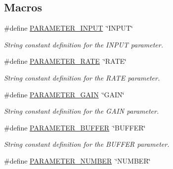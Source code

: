 \subsection*{Macros}
\begin{DoxyCompactItemize}
\item 
\hypertarget{group__command__interpreter_gaf1fc1a31411fef881a2ca2a38d375bda}{\#define \hyperlink{group__command__interpreter_gaf1fc1a31411fef881a2ca2a38d375bda}{P\-A\-R\-A\-M\-E\-T\-E\-R\-\_\-\-I\-N\-P\-U\-T}~\char`\"{}I\-N\-P\-U\-T\char`\"{}}\label{group__command__interpreter_gaf1fc1a31411fef881a2ca2a38d375bda}

\begin{DoxyCompactList}\small\item\em String constant definition for the I\-N\-P\-U\-T parameter. \end{DoxyCompactList}\item 
\hypertarget{group__command__interpreter_ga0edc411fe5766dfbe192e22155fb0020}{\#define \hyperlink{group__command__interpreter_ga0edc411fe5766dfbe192e22155fb0020}{P\-A\-R\-A\-M\-E\-T\-E\-R\-\_\-\-R\-A\-T\-E}~\char`\"{}R\-A\-T\-E\char`\"{}}\label{group__command__interpreter_ga0edc411fe5766dfbe192e22155fb0020}

\begin{DoxyCompactList}\small\item\em String constant definition for the R\-A\-T\-E parameter. \end{DoxyCompactList}\item 
\hypertarget{group__command__interpreter_gaf97c884c75bad1017220b24ccff04016}{\#define \hyperlink{group__command__interpreter_gaf97c884c75bad1017220b24ccff04016}{P\-A\-R\-A\-M\-E\-T\-E\-R\-\_\-\-G\-A\-I\-N}~\char`\"{}G\-A\-I\-N\char`\"{}}\label{group__command__interpreter_gaf97c884c75bad1017220b24ccff04016}

\begin{DoxyCompactList}\small\item\em String constant definition for the G\-A\-I\-N parameter. \end{DoxyCompactList}\item 
\hypertarget{group__command__interpreter_ga943938961217e5b466d15306bd5504b9}{\#define \hyperlink{group__command__interpreter_ga943938961217e5b466d15306bd5504b9}{P\-A\-R\-A\-M\-E\-T\-E\-R\-\_\-\-B\-U\-F\-F\-E\-R}~\char`\"{}B\-U\-F\-F\-E\-R\char`\"{}}\label{group__command__interpreter_ga943938961217e5b466d15306bd5504b9}

\begin{DoxyCompactList}\small\item\em String constant definition for the B\-U\-F\-F\-E\-R parameter. \end{DoxyCompactList}\item 
\hypertarget{group__command__interpreter_gadc1cbfe3c96811afe874d8fe8a76b967}{\#define \hyperlink{group__command__interpreter_gadc1cbfe3c96811afe874d8fe8a76b967}{P\-A\-R\-A\-M\-E\-T\-E\-R\-\_\-\-N\-U\-M\-B\-E\-R}~\char`\"{}N\-U\-M\-B\-E\-R\char`\"{}}\label{group__command__interpreter_gadc1cbfe3c96811afe874d8fe8a76b967}


\end{DoxyCompactItemize}
